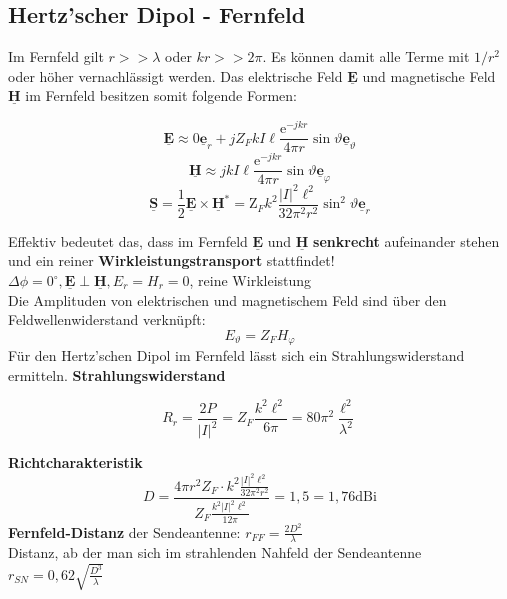 \documentclass[english]{latex4ei/latex4ei_sheet}
\renewcommand{\vec}[1]{\underline{\boldsymbol{#1}}}
\begin{document}
\begin{sectionbox}
\subsection{Hertz'scher Dipol - Fernfeld}
Im Fernfeld gilt $r >> \lambda$ oder $kr >> 2\pi$. Es können damit alle Terme mit $1/r^2$ oder höher vernachlässigt werden. Das elektrische Feld $\vec{E}$ und magnetische Feld $\vec{H}$ im Fernfeld besitzen somit folgende Formen:
\begin{emphbox}
$$
\vec{E} \approx 0 \vec{e}_{r}+j Z_{F} k I \ell \frac{\mathrm{e}^{-j k r}}{4 \pi r} \sin \vartheta \vec{e}_{\vartheta}
$$
$$
\vec{H} \approx j k I \ell \frac{\mathrm{e}^{-j k r}}{4 \pi r} \sin \vartheta \vec{e}_{\varphi}
$$
$$
\vec{S}=\frac{1}{2} \vec{E} \times \vec{H}^{*}=\mathrm{Z}_{F} k^{2} \frac{|I|^{2} \ell^{2}}{32 \pi^{2} r^{2}} \sin ^{2} \vartheta \vec{e}_{r}
$$
\end{emphbox}
Effektiv bedeutet das, dass im Fernfeld $\vec{E}$ und $\vec{H}$ \textbf{senkrecht} aufeinander stehen und ein reiner \textbf{Wirkleistungstransport} stattfindet!\\
$\Delta \phi=0^{\circ}, \vec{E} \perp \vec{H}, E_{r}=H_{r}=0$, reine Wirkleistung\\
Die Amplituden von elektrischen und magnetischem Feld sind über den Feldwellenwiderstand verknüpft:
$$
E_{\vartheta}=Z_{F} H_{\varphi}
$$
Für den Hertz'schen Dipol im Fernfeld lässt sich ein Strahlungswiderstand ermitteln.
\textbf{Strahlungswiderstand}
\begin{emphbox}
	$$
	R_{r}=\frac{2 P}{|I|^{2}}=Z_{F} \frac{k^{2} \ell^{2}}{6 \pi}=80 \pi^{2} \frac{\ell^{2}}{\lambda^{2}}
	$$
\end{emphbox}
\textbf{Richtcharakteristik}
$$
D=\frac{4 \pi r^{2} Z_{F} \cdot k^{2} \frac{|I|^{2} \ell^{2}}{32 \pi^{2} r^{2}}}{Z_{F} \frac{k^{2}|I|^{2} \ell^{2}}{12 \pi}}=1,5=1,76 \mathrm{dBi}
$$
\textbf{Fernfeld-Distanz} der Sendeantenne: $r_{FF} = \frac{2D^2}{\lambda}$\\
Distanz, ab der man sich im strahlenden Nahfeld der Sendeantenne $r_{SN} = 0,62\sqrt{\frac{D^3}{\lambda}}$
\end{sectionbox}
\end{document}
